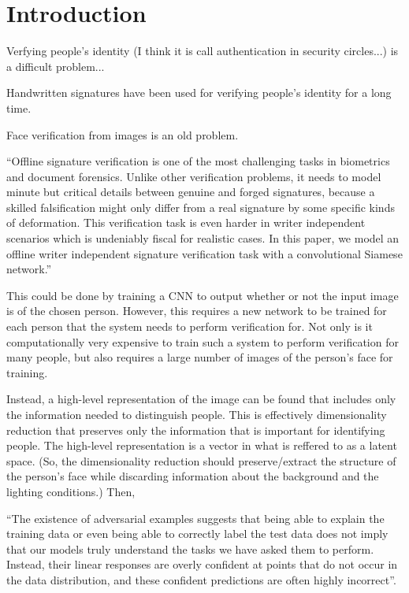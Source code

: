 \section{Introduction}\label{sec:introduction}

Verfying people's identity (I think it is call authentication in security circles...) is a difficult problem...

Handwritten signatures have been used for verifying people's identity for a long time.

Face verification from images is an old problem.

``Offline signature verification is one of the most challenging tasks in biometrics and document forensics. Unlike other verification problems, it needs to model minute but critical details between genuine
and forged signatures, because a skilled falsification might only differ from a real signature by some
specific kinds of deformation. This verification task is even harder in writer independent scenarios
which is undeniably fiscal for realistic cases. In this paper, we model an offline writer independent
signature verification task with a convolutional Siamese network.''\cite{sig_net}

This could be done by training a CNN to output whether or not the input image is of the chosen person.
However, this requires a new network to be trained for each person that the system needs to perform verification for.
Not only is it computationally very expensive to train such a system to perform verification for many people, but also requires a large number of images of the person's face for training.

Instead, a high-level representation of the image can be found that includes only the information needed to distinguish people.
This is effectively dimensionality reduction that preserves only the information that is important for identifying people.
The high-level representation is a vector in what is reffered to as a latent space.
(So, the dimensionality reduction should preserve/extract the structure of the person's face while discarding information about the background and the lighting conditions.)
Then,

``The existence of adversarial examples suggests that being able to
explain the training data or even being able to correctly label the test data does not imply that our
models truly understand the tasks we have asked them to perform. Instead, their linear responses are
overly confident at points that do not occur in the data distribution, and these confident predictions
are often highly incorrect''\cite{goodfellow}.
